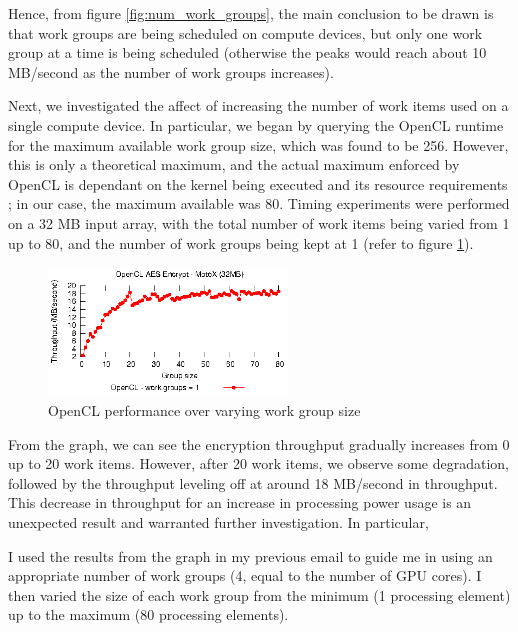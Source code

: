 \documentclass[conference,10pt]{IEEEtran}
\begin{document}
Hence, from figure \ref{fig:num_work_groups}, the main conclusion to be drawn is that work groups 
are being scheduled on compute devices, but only one work group at a time is being scheduled 
(otherwise the peaks would reach about 10 MB/second as the number of work groups increases).

Next, we investigated the affect of increasing the number of work items used on a single compute 
device.  In particular, we began by querying the OpenCL runtime for the maximum available work group 
size, which was found to be 256.  However, this is only a theoretical maximum, and the actual 
maximum enforced by OpenCL is dependant on the kernel being executed and its resource requirements 
\cite{opencl_guide}; in our case, the maximum available was 80.  Timing experiments were performed 
on a 32 MB input array, with the total number of work items being varied from 1 up to 80, and the 
number of work groups being kept at 1 (refer to figure \ref{fig:work_group_size}).

\begin{figure}[!t]
\centering
\includegraphics[width=2.5in]{../final/motox/4.2/sample_opencl_aes_work_group_size.32MB.1_work_groups.again.report.eps}
\caption{OpenCL performance over varying work group size}
\label{fig:work_group_size}
\end{figure}

From the graph, we can see the encryption throughput gradually increases from 0 up to 20 work items.  
However, after 20 work items, we observe some degradation, followed by the throughput leveling off 
at around 18 MB/second in throughput.  This decrease in throughput for an increase in processing 
power usage is an unexpected result and warranted further investigation.  In particular, 





I used the results from the graph in my previous email to guide me in using an appropriate number of 
work groups (4, equal to the number of GPU cores). I then varied the size of each work group from 
the minimum (1 processing element) up to the maximum (80 processing elements).
\end{document}
